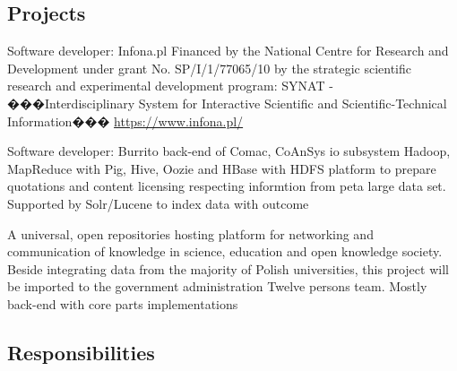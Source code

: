 


\subsection{Projects}

{Software developer: Infona.pl}
{Financed by the National Centre for Research and Development under grant
 No. SP/I/1/77065/10 by the strategic scientific research and experimental
  development program: SYNAT - ���Interdisciplinary System for Interactive
   Scientific and Scientific-Technical Information���}
 {}{}{\href{https://www.infona.pl/}{https://www.infona.pl/}}

{Software developer: Burrito back-end of Comac,
CoAnSys io subsystem} {Hadoop, MapReduce with Pig, Hive, Oozie and HBase with
HDFS platform to prepare quotations and content licensing respecting
informtion from peta large data set. Supported by Solr/Lucene to index data with
 outcome}
 {}{}
 {
 }
 
 {A universal, open repositories hosting platform for networking and communication 
 of knowledge in science, education and open knowledge society. Beside integrating
  data from the majority of Polish universities, this project will be imported to
   the government administration}
 {Twelve persons team. Mostly back-end with core parts implementations}
 {}
 {
 }



\subsection{Responsibilities}

